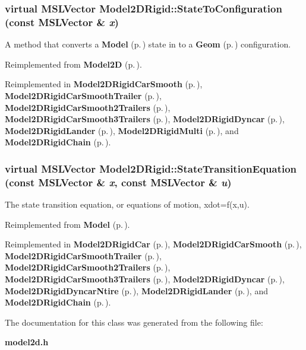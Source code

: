 \subsubsection{\setlength{\rightskip}{0pt plus 5cm}virtual {\bf MSLVector} Model2DRigid::State\-To\-Configuration (const {\bf MSLVector} \& {\em x})\hspace{0.3cm}{\tt  [virtual]}}\label{class_Model2DRigid_a6}


A method that converts a {\bf Model} {\rm (p.\,\pageref{class_Model})} state in to a {\bf Geom} {\rm (p.\,\pageref{class_Geom})} configuration.



Reimplemented from {\bf Model2D} {\rm (p.\,\pageref{class_Model2D_a2})}.

Reimplemented in {\bf Model2DRigid\-Car\-Smooth} {\rm (p.\,\pageref{class_Model2DRigidCarSmooth_a5})}, {\bf Model2DRigid\-Car\-Smooth\-Trailer} {\rm (p.\,\pageref{class_Model2DRigidCarSmoothTrailer_a4})}, {\bf Model2DRigid\-Car\-Smooth2Trailers} {\rm (p.\,\pageref{class_Model2DRigidCarSmooth2Trailers_a4})}, {\bf Model2DRigid\-Car\-Smooth3Trailers} {\rm (p.\,\pageref{class_Model2DRigidCarSmooth3Trailers_a4})}, {\bf Model2DRigid\-Dyncar} {\rm (p.\,\pageref{class_Model2DRigidDyncar_a3})}, {\bf Model2DRigid\-Lander} {\rm (p.\,\pageref{class_Model2DRigidLander_a3})}, {\bf Model2DRigid\-Multi} {\rm (p.\,\pageref{class_Model2DRigidMulti_a3})}, and {\bf Model2DRigid\-Chain} {\rm (p.\,\pageref{class_Model2DRigidChain_a2})}.
\subsubsection{\setlength{\rightskip}{0pt plus 5cm}virtual {\bf MSLVector} Model2DRigid::State\-Transition\-Equation (const {\bf MSLVector} \& {\em x}, const {\bf MSLVector} \& {\em u})\hspace{0.3cm}{\tt  [virtual]}}\label{class_Model2DRigid_a3}


The state transition equation, or equations of motion, xdot=f(x,u).



Reimplemented from {\bf Model} {\rm (p.\,\pageref{class_Model_a3})}.

Reimplemented in {\bf Model2DRigid\-Car} {\rm (p.\,\pageref{class_Model2DRigidCar_a2})}, {\bf Model2DRigid\-Car\-Smooth} {\rm (p.\,\pageref{class_Model2DRigidCarSmooth_a2})}, {\bf Model2DRigid\-Car\-Smooth\-Trailer} {\rm (p.\,\pageref{class_Model2DRigidCarSmoothTrailer_a2})}, {\bf Model2DRigid\-Car\-Smooth2Trailers} {\rm (p.\,\pageref{class_Model2DRigidCarSmooth2Trailers_a2})}, {\bf Model2DRigid\-Car\-Smooth3Trailers} {\rm (p.\,\pageref{class_Model2DRigidCarSmooth3Trailers_a2})}, {\bf Model2DRigid\-Dyncar} {\rm (p.\,\pageref{class_Model2DRigidDyncar_a4})}, {\bf Model2DRigid\-Dyncar\-Ntire} {\rm (p.\,\pageref{class_Model2DRigidDyncarNtire_a2})}, {\bf Model2DRigid\-Lander} {\rm (p.\,\pageref{class_Model2DRigidLander_a4})}, and {\bf Model2DRigid\-Chain} {\rm (p.\,\pageref{class_Model2DRigidChain_a3})}.

The documentation for this class was generated from the following file:\begin{CompactItemize}
\item 
{\bf model2d.h}\end{CompactItemize}

